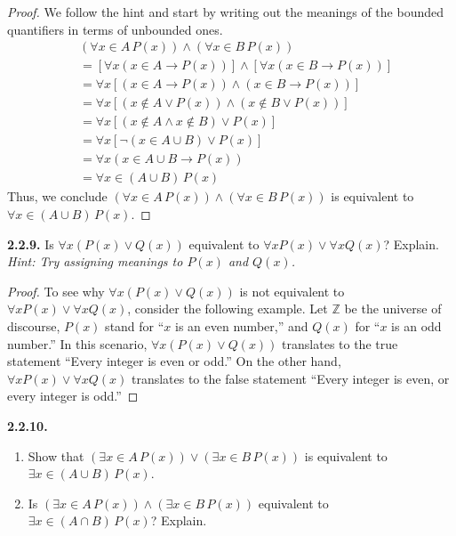 \documentclass[12pt]{amsart}
\newenvironment{statement}[1]{\smallskip\noindent\color[rgb]{.6627, .3529, .6314} {\bf #1.}}{}
\theoremstyle{definition}
\theoremstyle{remark}
\newcommand{\BZ}{\mathbb Z}
\begin{document}
\begin{proof}
We follow the hint and start by writing out the meanings of the bounded quantifiers in terms of unbounded ones.
\begin{align*}
	& (\forall x \in A \, P(x)) \wedge (\forall x \in B \, P(x)) \\
	&= [\forall x (x \in A \rightarrow P(x))] \wedge [\forall x (x \in B \rightarrow P(x))] \\
	&= \forall x [(x \in A \rightarrow P(x)) \wedge (x \in B \rightarrow P(x))] \\
	&= \forall x [(x \notin A \vee P(x)) \wedge (x \notin B \vee P(x))] \\
	&= \forall x [(x \notin A \wedge x \notin B) \vee P(x)] \\
	&= \forall x [\neg (x \in A \cup B) \vee P(x)] \\
	&= \forall x (x \in A \cup B \rightarrow P(x)) \\
	&= \forall x \in (A \cup B) \, P(x)
\end{align*}
Thus, we conclude $(\forall x \in A \, P(x)) \wedge (\forall x \in B \, P(x))$ is equivalent to $\forall x \in (A \cup B) \, P(x)$.
\end{proof}


\begin{statement}{2.2.9}
Is $\forall x (P(x) \vee Q(x))$ equivalent to $\forall x P(x) \vee \forall x Q(x)$?
Explain.
\emph{Hint: Try assigning meanings to $P(x)$ and $Q(x)$.}
\end{statement}

\begin{proof}
To see why $\forall x (P(x) \vee Q(x))$ is not equivalent to $\forall x P(x) \vee \forall x Q(x)$,
consider the following example.
Let $\BZ$ be the universe of discourse, $P(x)$ stand for ``$x$ is an even number,''
and $Q(x)$ for ``$x$ is an odd number.''
In this scenario, $\forall x (P(x) \vee Q(x))$ translates to the true statement 
``Every integer is even or odd.''
On the other hand, $\forall x P(x) \vee \forall x Q(x)$ translates to the false statement
``Every integer is even, or every integer is odd.''
\end{proof}


\begin{statement}{2.2.10}
\begin{enumerate}
	\item Show that $(\exists x \in A \, P(x)) \vee (\exists x \in B \, P(x))$ is equivalent to
	$\exists x \in (A \cup B) \, P(x)$.
	
	\item Is $(\exists x \in A \, P(x)) \wedge (\exists x \in B \, P(x))$ equivalent to
	$\exists x \in (A \cap B) \, P(x)$?
	Explain.
\end{enumerate}
\end{statement}
\end{document}
